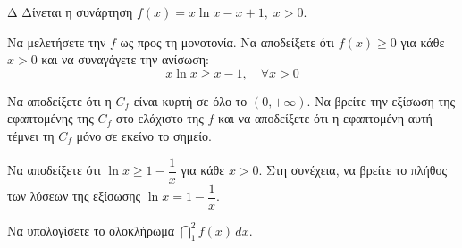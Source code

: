 \begin{thema}{Δ}
Δίνεται η συνάρτηση $\displaystyle f(x) = x\ln x - x + 1, \; x > 0$.
\begin{erwthma}
    \item Να μελετήσετε την $f$ ως προς τη μονοτονία. Να αποδείξετε ότι $f(x) \ge 0$ για κάθε $x > 0$ και να συναγάγετε την ανίσωση:
    \[ x\ln x \ge x - 1, \quad \forall x > 0 \]
    \item Να αποδείξετε ότι η $C_f$ είναι κυρτή σε όλο το $(0,+\infty)$. Να βρείτε την εξίσωση της εφαπτομένης της $C_f$ στο ελάχιστο της $f$ και να αποδείξετε ότι η εφαπτομένη αυτή τέμνει τη $C_f$ μόνο σε εκείνο το σημείο.
    \item Να αποδείξετε ότι $\ln x \ge 1 - \dfrac{1}{x}$ για κάθε $x > 0$. Στη συνέχεια, να βρείτε το πλήθος των λύσεων της εξίσωσης $\ln x = 1 - \dfrac{1}{x}$.
    \item Να υπολογίσετε το ολοκλήρωμα $\displaystyle\dint_1^2 f(x)\, dx$.
\end{erwthma}
\end{thema}
